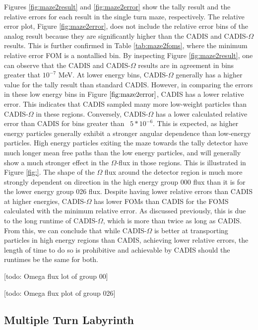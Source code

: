 Figures \ref{fig:maze2result} and \ref{fig:maze2error} show the tally result and
the relative errors for each result in the single turn maze, respectively.
The relative error plot, Figure \ref{fig:maze2error}, does not include the
relative error bins of the analog result because they are significantly higher
than the CADIS and CADIS-$\Omega$ results. This is further confirmed in Table
\ref{tab:maze2foms}, where the minimum relative error FOM is a nontallied bin.
By inspecting Figure \ref{fig:maze2result}, one can observe that the CADIS and
CADIS-$\Omega$ results are in agreement in bins greater that $10^{-7}$ MeV. At
lower energy bins, CADIS-$\Omega$ generally has a higher value for the tally
result than standard CADIS. However, in comparing the errors in these low energy
bins in Figure $\ref{fig:maze2error}$, CADIS has a lower relative error. This
indicates that CADIS sampled many more low-weight particles than CADIS-$\Omega$
in these regions. Conversely, CADIS-$\Omega$ has a lower calculated relative
error than CADIS for bins greater than ~$5*10^{-6}$. This is expected, as
higher energy particles generally exhibit a stronger angular dependence than
low-energy particles. High energy particles exiting the maze towards the tally
detector have much longer mean free paths than the low energy particles, and
will generally show a much stronger effect in the $\Omega$-flux in those
regions. This is illustrated in Figure \ref{fig:}. The shape of the $\Omega$
flux around the detector region is much more strongly dependent on direction in
the high energy group 000 flux than it is for the lower energy group 026 flux.
Despite having lower relative errors than CADIS at higher energies,
CADIS-$\Omega$ has lower FOMs than CADIS for the FOMS calculated with the
minimum relative error. As discussed previously, this is due to the long runtime
of CADIS-$\Omega$, which is more than twice as long as CADIS. From this, we can
conclude that while CADIS-$\Omega$ is better at transporting particles in high
energy regions than CADIS, achieving lower relative errors, the length of time
to do so is prohibitive and achievable by CADIS should the runtimes be the same
for both.

[todo: Omega flux lot of group 00]

[todo: Omega flux plot of group 026]

\subsection{Multiple Turn Labyrinth}

